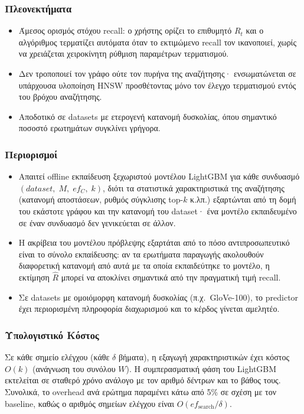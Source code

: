 \documentclass[12pt,a4paper]{article}
\begin{document}
\subsubsection*{Πλεονεκτήματα}
\begin{itemize}
    \item Άμεσος ορισμός στόχου recall: ο χρήστης ορίζει το επιθυμητό $R_t$ και ο αλγόριθμος τερματίζει αυτόματα όταν το εκτιμώμενο recall τον ικανοποιεί, χωρίς να χρειάζεται χειροκίνητη ρύθμιση παραμέτρων τερματισμού.
    \item Δεν τροποποιεί τον γράφο ούτε τον πυρήνα της αναζήτησης· ενσωματώνεται σε υπάρχουσα υλοποίηση HNSW προσθέτοντας μόνο τον έλεγχο τερματισμού εντός του βρόχου αναζήτησης.
    \item Αποδοτικό σε datasets με ετερογενή κατανομή δυσκολίας, όπου σημαντικό ποσοστό ερωτημάτων συγκλίνει γρήγορα.
\end{itemize}

\subsubsection*{Περιορισμοί}
\begin{itemize}
    \item Απαιτεί offline εκπαίδευση ξεχωριστού μοντέλου LightGBM για κάθε συνδυασμό $(dataset,\; M,\; ef_C,\; k)$, διότι τα στατιστικά χαρακτηριστικά της αναζήτησης (κατανομή αποστάσεων, ρυθμός σύγκλισης top-$k$ κ.λπ.) εξαρτώνται από τη δομή του εκάστοτε γράφου και την κατανομή του dataset· ένα μοντέλο εκπαιδευμένο σε έναν συνδυασμό δεν γενικεύεται σε άλλον.
    \item Η ακρίβεια του μοντέλου πρόβλεψης εξαρτάται από το πόσο αντιπροσωπευτικό είναι το σύνολο εκπαίδευσης: αν τα ερωτήματα παραγωγής ακολουθούν διαφορετική κατανομή από αυτά με τα οποία εκπαιδεύτηκε το μοντέλο, η εκτίμηση $\hat{R}$ μπορεί να αποκλίνει σημαντικά από την πραγματική τιμή recall.
    \item Σε datasets με ομοιόμορφη κατανομή δυσκολίας (π.χ.\ GloVe-100), το predictor έχει περιορισμένη πληροφορία διαχωρισμού και το κέρδος γίνεται αμελητέο.
\end{itemize}

\subsubsection*{Υπολογιστικό Κόστος}
Σε κάθε σημείο ελέγχου (κάθε $\delta$ βήματα), η εξαγωγή χαρακτηριστικών έχει κόστος $O(k)$ (ανάγνωση του συνόλου $W$). Η συμπερασματική φάση του LightGBM εκτελείται σε σταθερό χρόνο ανάλογο με τον αριθμό δέντρων και το βάθος τους. Συνολικά, το overhead ανά ερώτημα παραμένει κάτω από 5\% σε σχέση με τον baseline, καθώς ο αριθμός σημείων ελέγχου είναι $O(ef_{\text{search}}/\delta)$.
\end{document}
